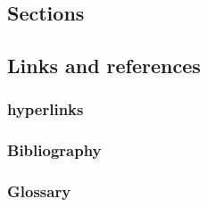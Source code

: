     \subsection{Sections}
    \label{sec:tutorial/latex/sec}
    

    \subsection*{\thesubsection\hspace{1em}Links and \glspl{reference}}
    \label{sec:tutorial/latex/crossref}
    
        
        \subsubsection*{\thesubsubsection\hspace{1em}}
        \label{sec:tutorial/latex/crossref/label}
        
        
        \subsubsection*{\thesubsubsection\hspace{1em}\Glspl{hyperlink}}
        \label{sec:tutorial/latex/crossref/hyper}
        
    
        \subsubsection{Bibliography}
        \label{sec:tutorial/latex/crossref/bibtex}
        
        
        \subsubsection{Glossary}
        \label{sec:tutorial/latex/crossref/glossary}
        

